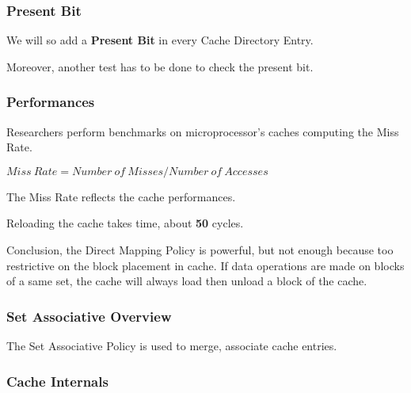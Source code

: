 
\begin{frame}
  \frametitle{Present Bit}

  We will so add a \textbf{Present Bit} in every Cache Directory Entry.

  \-

  Moreover, another test has to be done to check the present bit.
\end{frame}


\begin{frame}[containsverbatim]
  \frametitle{Performances}

  Researchers perform benchmarks on microprocessor's caches
  computing the Miss Rate.

  \-

  $Miss~Rate = Number~of~Misses / Number~of~Accesses$

  \-

  The Miss Rate reflects the cache performances.

  \-

  Reloading the cache takes time, about \textbf{50} cycles.

  \-

  Conclusion, the Direct Mapping Policy is powerful, but not enough because
  too restrictive on the block placement in cache. If data operations
  are made on blocks of a same set, the cache will always load then unload
  a block of the cache.
\end{frame}


\begin{frame}
  \frametitle{Set Associative Overview}

  The Set Associative Policy is used to merge, associate cache entries.

  \begin{center}
  \end{center}
\end{frame}


\begin{frame}
  \frametitle{Cache Internals}

  \begin{center}
  \end{center}
\end{frame}


